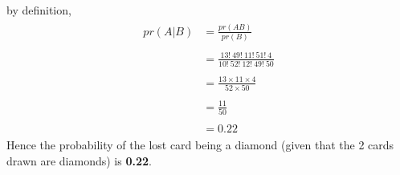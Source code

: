 \documentclass[journal,12pt,twocolumn]{IEEEtran}
\begin{document}
by definition,
\begin{align}
\begin{split}
    pr(A \vert B)&=\frac{pr(AB)}{pr(B)}\\\\
                 &=\frac{13!\:49!\:11!\:51!\:4}{10!\:52!\:12!\:49!\:50}\\\\
                 &=\frac{13 \times 11 \times 4}{52 \times 50}\\\\
                 &=\frac{11}{50}\\\\
                 &=0.22
\end{split}
\end{align}
Hence the probability of the lost card being a diamond (given that the 2 cards drawn are diamonds) is \textbf{0.22}.
\end{document}
